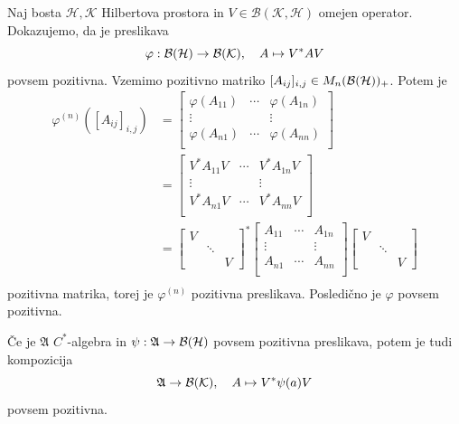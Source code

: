 \begin{zgled}\label{zgl:1.5}
    Naj bosta $\mathcal{H}, \mathcal{K}$ Hilbertova prostora in $V \in \mathcal{B}(\mathcal{K}, \mathcal{H})$
    omejen operator. Dokazujemo, da je preslikava
    $$\varphi: \operatorname{\mathcal{B} (\mathcal{H})} \to  \operatorname{\mathcal{B} (\mathcal{K})},\quad A \mapsto V^* A V$$
    povsem pozitivna. Vzemimo pozitivno matriko $[A_{ij}]_{i, j} \in M_n (\operatorname{\mathcal{B} (\mathcal{H})})_+$.
    Potem je 
    \begin{align*}
        \varphi^{(n)} ([A_{ij}]_{i, j}) &= \begin{bmatrix}
            \varphi(A_{11}) & \cdots & \varphi(A_{1n})\\
            \vdots & & \vdots\\
            \varphi(A_{n1}) & \cdots & \varphi(A_{nn})\\
        \end{bmatrix}\\
        &= \begin{bmatrix}
            V^* A_{11} V & \cdots & V^* A_{1n} V\\
            \vdots & & \vdots\\
            V^* A_{n1} V & \cdots & V^* A_{nn} V\\
        \end{bmatrix}\\
        &= \begin{bmatrix}
            V & &\\
             & \ddots & \\
             & & V
        \end{bmatrix}^* \begin{bmatrix}
            A_{11} & \cdots & A_{1n}\\
            \vdots & & \vdots\\
            A_{n1} & \cdots & A_{nn}\\
        \end{bmatrix} \begin{bmatrix}
            V & &\\
             & \ddots & \\
             & & V
        \end{bmatrix}\\
    \end{align*}
    pozitivna matrika, torej je $\varphi ^{(n)}$ pozitivna preslikava. 
    Posledično je $\varphi$ povsem pozitivna.

    Če je $\mathfrak{A}$ $C^*$-algebra in $\psi: \mathfrak{A} \to \operatorname{\mathcal{B} (\mathcal{H})}$ povsem pozitivna preslikava,
    potem je tudi kompozicija 
    $$
        \mathfrak{A} \to  \operatorname{\mathcal{B} (\mathcal{K})},\quad A \mapsto V^* \psi (a) V 
    $$
    povsem pozitivna.
\end{zgled}


